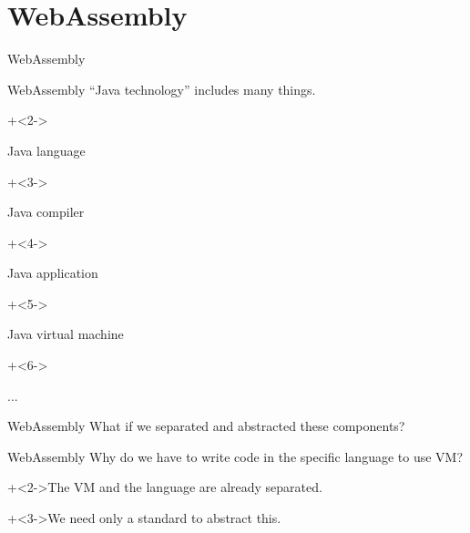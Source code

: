 %
%

\section{WebAssembly}


\begin{frame}{}{}
    {\Huge WebAssembly}
\end{frame}


\begin{frame}{WebAssembly}{}
    ``Java technology'' includes many things.
    \vspace{4ex}

    \begin{itemize}
        \onslide+<2->{\item Java language}
        \onslide+<3->{\item Java compiler}
        \onslide+<4->{\item Java application}
        \onslide+<5->{\item Java virtual machine}
        \onslide+<6->{\item ...}
    \end{itemize}
\end{frame}


\begin{frame}{WebAssembly}{}
    What if we separated and abstracted these components?    
\end{frame}


\begin{frame}{WebAssembly}{}
    Why do we have to write code in the specific language to use VM?
    \vspace{4ex}

    \onslide+<2->{The VM and the language are already separated.}
    \vspace{4ex}

    \onslide+<3->{We need only a standard to abstract this.}
\end{frame}


